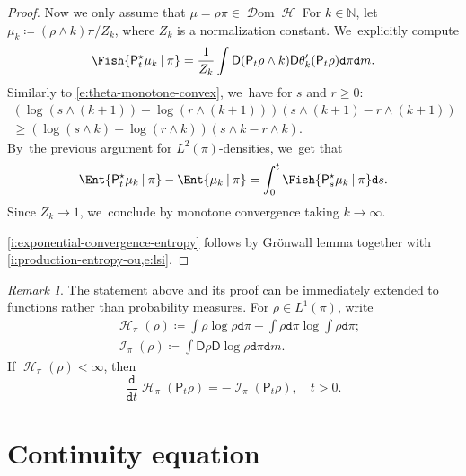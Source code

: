 \documentclass[JEP,XML,SOM,Unicode,published]{cedram}
\theoremstyle{definition}
\theoremstyle{remark}
\newtheorem{remark}[theorem]{Remark}
\newcommand{\given}[1][]{%
\nonscript\:#1\vert
\allowbreak
\nonscript\:
\mathopen{}}
\DeclareMathOperator{\ent}{\mathcal{H}}
\DeclareMathOperator{\fish}{\mathcal{I}}
\DeclareMathOperator{\dom}{\mathscr{D}om}
\begin{document}
\begin{proof}
Now we only assume that $\mu = \rho \pi \in \dom \ent$
For $k \in \mathbb{N}$, let $\mu_{k} \coloneq (\rho \wedge k) \pi / Z_{k}$, where $Z_k$ is a normalization constant. We~explicitly compute
\begin{equation*}
\Fish{ \mathsf{P}_{t}^{\star} \mu_{k} \given \pi } = \frac{1}{Z_{k}} \int \mathsf{D} (\mathsf{P}_{t} \rho \wedge k) \mathsf{D} \theta'_{k}(\mathsf{P}_{t} \rho) \mathtt{d} \pi \mathtt{d} m.
\end{equation*}
Similarly to \cref{e:theta-monotone-convex}, we~have for $s$ and $r \geq 0$:
\begin{multline*}
(\log(s \wedge (k+1)) - \log(r \wedge (k+1)))(s \wedge (k+1) - r \wedge (k+1))\\
\geq (\log(s \wedge k) - \log(r \wedge k))(s \wedge k - r \wedge k).
\end{multline*}
By~the previous argument for $L^{2}(\pi)$-densities, we~get that
\begin{equation*}
\Ent{ \mathsf{P}^{\star}_{t} \mu_{k} \given \pi } - \Ent{ \mu_{k} \given \pi } = \int_{0}^{t} \Fish{ \mathsf{P}_{s}^{\star} \mu_{k} \given \pi } \mathtt{d} s.
\end{equation*}
Since $Z_{k} \to 1$, we~conclude by monotone convergence taking $k \to \infty$.

\cref{i:exponential-convergence-entropy}
follows by Grönwall lemma together with \cref{i:production-entropy-ou,e:lsi}.
\end{proof}

\begin{remark}
The statement above and its proof can be immediately extended to functions rather than probability measures.
For $\rho \in L^{1}(\pi)$, write
\begin{align*}
& \ent_{\pi}(\rho) \coloneq \int \rho \log \rho \mathtt{d} \pi - \int \rho \mathtt{d} \pi \log \int \rho \mathtt{d} \pi;
\\ & \fish_{\pi}(\rho) \coloneq \int \mathsf{D} \rho \mathsf{D} \log \rho \mathtt{d} \pi \mathtt{d} m.
\end{align*}
If $\ent_{\pi}(\rho) < \infty$, then
\begin{equation*}
\frac{\mathtt{d}}{\mathtt{d} t} \ent_{\pi}(\mathsf{P}_{t}\rho) = - \fish_{\pi}(\mathsf{P}_{t} \rho), \quad t > 0.
\end{equation*}
\end{remark}

\section{Continuity equation}\label{s:continuity-equation}
\end{document}
